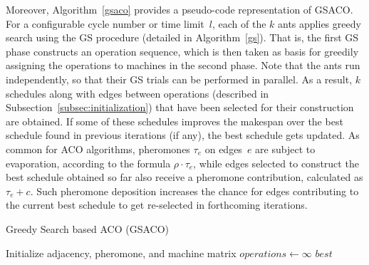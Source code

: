 \documentclass[runningheads]{llncs}
\begin{document}
Moreover, Algorithm~\ref{gsaco} provides a pseudo-code representation of
GSACO.
For a configurable cycle number or time limit~$l$,
each of the $k$ ants applies greedy search
using the GS procedure (detailed in Algorithm~\ref{gs}).
That is, the first GS phase constructs an operation sequence, which is
then taken as basis for greedily assigning the operations to machines
in the second phase.   
Note that the ants run independently, so that their GS trials
can be performed in parallel.
As a result, $k$ schedules along with edges between operations
(described in Subsection~\ref{subsec:initialization})
that have been selected for their construction are obtained.
If some of these schedules improves the makespan over the best
schedule found in previous iterations (if any),
the best schedule gets updated.
As common for ACO algorithms,
pheromones $\tau_e$ on edges~$e$ are subject to evaporation,
according to the formula $\rho\cdot\tau_e$,
while edges selected to construct the best schedule obtained
so far also receive a pheromone contribution,
calculated as $\tau_e+c$.
Such pheromone deposition increases the chance for edges contributing to the
current best schedule
to get re-selected %
in forthcoming iterations.

%
\begin{algorithm}[t]
	\caption{Greedy Search based ACO (GSACO)}
	\label{gsaco}
	Initialize 
	adjacency, pheromone, and machine matrix\; %
	$\mathit{operations}\leftarrow \infty$\; 
		\While{cycle or time limit $l$ is not reached}{
			\ForEach{ant \KwFrom $1$ \KwTo $k$}{
				Run GS procedure to find a schedule\;
			}
			$\mathit{new}\leftarrow {}$ maximum operations of ants' schedules\;
			\If{$\mathit{new}>\mathit{operations}$}{ %
				$\mathit{operations}\leftarrow \mathit{new}$\;
				$\mathit{best}\leftarrow {}$an ant's schedule of $\mathit{operations}$\;
			}
			\ForEach{edge $e$ in pheromone matrix}{
				$\tau_{e} \leftarrow \max\{\rho\cdot\tau_e,\tau_z\}$\tcp*[r]{evaporation}%
		}
		\ForEach{edge $e$ selected by $\mathit{best}$ ant}{
			$\tau_{e} \leftarrow \tau_e+c$\tcp*[r]{deposit pheromones}
		}
	}
	\Return $\mathit{best}$\;
\end{algorithm}
\end{document}
